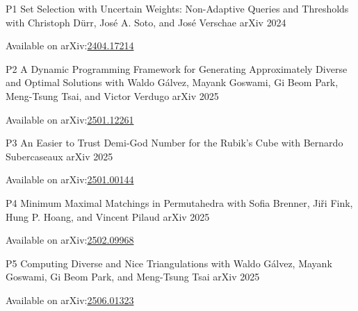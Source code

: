 \begin{cvpublication}
	{P1}
	{Set Selection with Uncertain Weights: Non-Adaptive Queries and Thresholds}
	{with Christoph Dürr, José A. Soto, and José Verschae}
	{arXiv}
    {2024}
	{
	\begin{cvitems}
		\item Available on arXiv:\href{https://arxiv.org/abs/2404.17214}{2404.17214}
	\end{cvitems}
	}
\end{cvpublication}
\begin{cvpublication}
	{P2}
	{A Dynamic Programming Framework for Generating Approximately Diverse and Optimal Solutions}
	{with Waldo Gálvez, Mayank Goswami, Gi Beom Park, Meng-Tsung Tsai, and Victor Verdugo}
	{arXiv}
    {2025}
	{
	\begin{cvitems}
		\item Available on arXiv:\href{https://arxiv.org/abs/2501.12261}{2501.12261}
	\end{cvitems}
	}
\end{cvpublication}
\begin{cvpublication}
	{P3}
	{An Easier to Trust Demi-God Number for the Rubik's Cube}
	{with Bernardo Subercaseaux}
	{arXiv}
    {2025}
	{
	\begin{cvitems}
		\item Available on arXiv:\href{https://arxiv.org/abs/2501.00144}{2501.00144}
	\end{cvitems}
	}
\end{cvpublication}
\begin{cvpublication}
	{P4}
	{Minimum Maximal Matchings in Permutahedra}
	{with Sofia Brenner, Jiři Fink, Hung P. Hoang, and Vincent Pilaud}
	{arXiv}
    {2025}
	{
	\begin{cvitems}
		\item Available on arXiv:\href{https://arxiv.org/abs/2502.09968}{2502.09968}
	\end{cvitems}
	}
\end{cvpublication}
\begin{cvpublication}
	{P5}
	{Computing Diverse and Nice Triangulations}
	{with Waldo Gálvez, Mayank Goswami, Gi Beom Park, and Meng-Tsung Tsai}
	{arXiv}
    {2025}
	{
	\begin{cvitems}
		\item Available on arXiv:\href{https://arxiv.org/abs/2506.01323}{2506.01323}
	\end{cvitems}
	}
\end{cvpublication}